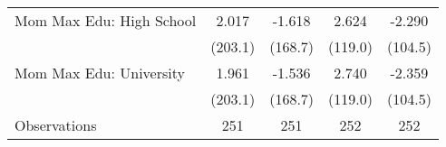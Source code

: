 {\begin{tabular}{l*{4}{c}}
\addlinespace
Mom Max Edu: High School&       2.017         &      -1.618         &       2.624         &      -2.290         \\
                    &     (203.1)         &     (168.7)         &     (119.0)         &     (104.5)         \\
\addlinespace
Mom Max Edu: University&       1.961         &      -1.536         &       2.740         &      -2.359         \\
                    &     (203.1)         &     (168.7)         &     (119.0)         &     (104.5)         \\
\midrule
Observations        &         251         &         251         &         252         &         252         \\
\bottomrule
\end{tabular}
}
